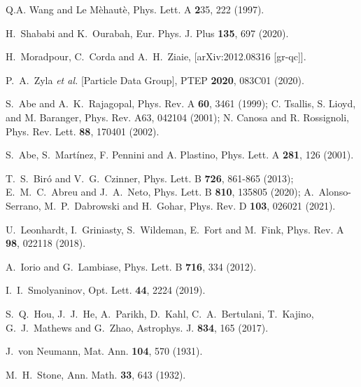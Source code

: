 \documentclass[floats,prd,aps,amssymb,nofootinbib,showkeys]{revtex4}
\begin{document}
\begin{thebibliography}{0}
Q.A. Wang and Le M\`ehaut\`e, Phys. Lett. A {\textbf 235}, 222 (1997).

H.~Shababi and K.~Ourabah,
Eur. Phys. J. Plus \textbf{135}, 697 (2020).

H.~Moradpour, C.~Corda and A.~H.~Ziaie,
[arXiv:2012.08316 [gr-qc]].

P.~A.~Zyla \textit{et al.} [Particle Data Group],
PTEP \textbf{2020}, 083C01 (2020). 

S.~Abe and A.~K.~Rajagopal,
Phys. Rev. A \textbf{60}, 3461 (1999);
C. Tsallis, S. Lioyd, and M. Baranger, Phys. Rev. A63, 042104 (2001);
N. Canosa and R. Rossignoli, Phys. Rev. Lett. {\bf 88}, 170401 (2002).

S.~Abe, S.~Mart\'inez, F. Pennini and A. Plastino, Phys.
Lett. A \textbf{281}, 126 (2001).

T.~S.~Bir\'o and V.~G.~Czinner,
Phys. Lett. B \textbf{726}, 861-865 (2013);
E.~M.~C.~Abreu and J.~A.~Neto,
Phys. Lett. B \textbf{810}, 135805 (2020);
A.~Alonso-Serrano, M.~P.~Dabrowski and H.~Gohar,
Phys. Rev. D \textbf{103}, 026021 (2021).

U.~Leonhardt, I.~Griniasty, S.~Wildeman, E.~Fort and M.~Fink,
Phys. Rev. A \textbf{98}, 022118 (2018). 

A.~Iorio and G.~Lambiase,
Phys. Lett. B \textbf{716}, 334 (2012).  

I.~I.~Smolyaninov, Opt. Lett. \textbf{44}, 2224 (2019). 
 
S.~Q.~Hou, J.~J.~He, A.~Parikh, D.~Kahl, C.~A.~Bertulani, T.~Kajino, G.~J.~Mathews and G.~Zhao,
Astrophys. J. \textbf{834}, 165 (2017).

J.~von Neumann, Mat. Ann. {\bf 104}, 570 (1931).

M.~H.~Stone, Ann. Math. {\bf 33}, 643
(1932).


\end{thebibliography}
\end{document}
